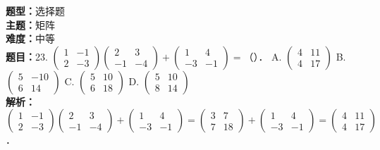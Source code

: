 \documentclass{ctexart}
\newenvironment{question}[5]{%
	\noindent\textbf{题型：}#1\\
	\textbf{主题：}#2\\
	\textbf{难度：}#3\\
	\textbf{题目：}#4\\
	\textbf{解析：}#5\\
	\vspace{1em}
}{}
\begin{document}
	\begin{question}
		{选择题}
		{矩阵}
		{中等}
		{23. \(\left(\begin{array}{ll}1 & -1 \\ 2 & -3\end{array}\right)\left(\begin{array}{cc}2 & 3 \\ -1 & -4\end{array}\right)+\left(\begin{array}{cc}1 & 4 \\ -3 & -1\end{array}\right)=\)（）．
			A. \(\left(\begin{array}{ll}4 & 11 \\ 4 & 17\end{array}\right)\)
			B. \(\left(\begin{array}{cc}5 & -10 \\ 6 & 14\end{array}\right)\)
			C. \(\left(\begin{array}{ll}5 & 10 \\ 6 & 18\end{array}\right)\)
			D. \(\left(\begin{array}{ll}5 & 10 \\ 8 & 14\end{array}\right)\)}
		{\(\left(\begin{array}{ll}1 & -1 \\ 2 & -3\end{array}\right)\left(\begin{array}{cc}2 & 3 \\ -1 & -4\end{array}\right)+\left(\begin{array}{cc}1 & 4 \\ -3 &-1\end{array}\right)=\left(\begin{array}{cc}3 & 7 \\ 7 &18\end{array}\right)+\left(\begin{array}{cc}1 & 4 \\ -3 &-1\end{array}\right)=\left(\begin{array}{ll}4 & 11 \\ 4 & 17\end{array}\right)\)．}
	\end{question}
	
\end{document}
